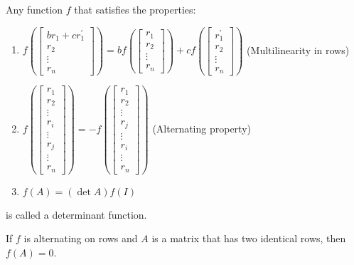 \documentclass[11pt]{article}
\begin{document}
\begin{definition}
    Any function $f$ that satisfies the properties:
    \begin{enumerate}
        \item $f\left(\begin{bmatrix}
            br_1 + cr_1^\prime \\ r_2 \\ \vdots \\ r_n
        \end{bmatrix}\right) = bf\left(\begin{bmatrix}
            r_1 \\ r_2 \\ \vdots \\ r_n
        \end{bmatrix}\right) + cf\left(\begin{bmatrix}
            r_1^\prime \\ r_2 \\ \vdots \\ r_n
        \end{bmatrix}\right)$ (Multilinearity in rows)
        
        \item $f\left(\begin{bmatrix}
            r_1 \\ r_2 \\ \vdots \\ r_i \\ \vdots \\ r_j \\ \vdots \\ r_n
        \end{bmatrix}\right) = -f\left(\begin{bmatrix}
            r_1 \\ r_2 \\ \vdots \\ r_j \\ \vdots \\ r_i \\ \vdots \\ r_n
        \end{bmatrix}\right)$ (Alternating property)
        
        \item $f(A) = (\det A )f(I)$
    \end{enumerate}
    is called a determinant function.
\end{definition}
\begin{theorem}
    If $f$ is alternating on rows and $A$ is a matrix that has two identical rows, then $f(A) = 0$.
\end{theorem}
\end{document}

